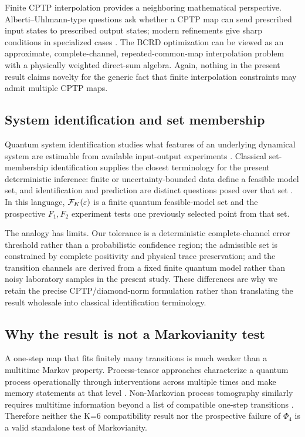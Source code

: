 Finite CPTP interpolation provides a neighboring mathematical perspective.  Alberti--Uhlmann-type questions ask whether a CPTP map can send prescribed input states to prescribed output states; modern refinements give sharp conditions in specialized cases \cite{ChakrabortyEtAl2020}.  The BCRD optimization can be viewed as an approximate, complete-channel, repeated-common-map interpolation problem with a physically weighted direct-sum algebra.  Again, nothing in the present result claims novelty for the generic fact that finite interpolation constraints may admit multiple CPTP maps.

\subsection{System identification and set membership}

Quantum system identification studies what features of an underlying dynamical system are estimable from available input-output experiments \cite{BurgarthYuasa2012}.  Classical set-membership identification supplies the closest terminology for the present deterministic inference: finite or uncertainty-bounded data define a feasible model set, and identification and prediction are distinct questions posed over that set \cite{MilaneseNovara2004,MilaneseNovara2011}.  In this language, $\mathcal F_K(\varepsilon)$ is a finite quantum feasible-model set and the prospective $F_1,F_2$ experiment tests one previously selected point from that set.

The analogy has limits.  Our tolerance is a deterministic complete-channel error threshold rather than a probabilistic confidence region; the admissible set is constrained by complete positivity and physical trace preservation; and the transition channels are derived from a fixed finite quantum model rather than noisy laboratory samples in the present study.  These differences are why we retain the precise CPTP/diamond-norm formulation rather than translating the result wholesale into classical identification terminology.

\subsection{Why the result is not a Markovianity test}

A one-step map that fits finitely many transitions is much weaker than a multitime Markov property.  Process-tensor approaches characterize a quantum process operationally through interventions across multiple times and make memory statements at that level \cite{PollockEtAl2018ProcessTensor,PollockEtAl2018Markov}.  Non-Markovian process tomography similarly requires multitime information beyond a list of compatible one-step transitions \cite{WhiteEtAl2022}.  Therefore neither the K=6 compatibility result nor the prospective failure of $\Phi_4$ is a valid standalone test of Markovianity.

